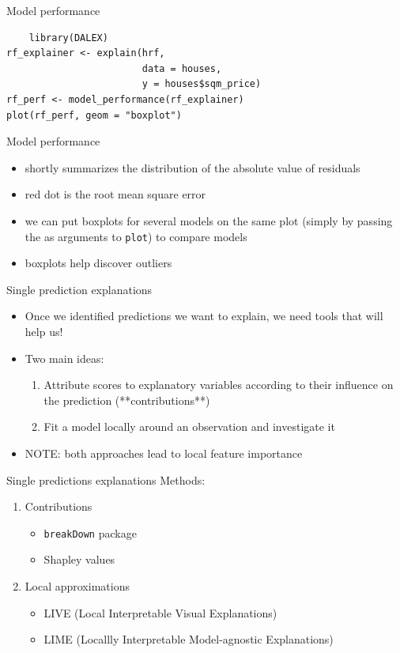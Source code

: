 \documentclass[xcolor={dvipsnames}]{beamer}
\begin{document}
\begin{frame}[fragile]{Model performance}
	\begin{lstlisting}
	library(DALEX)
rf_explainer <- explain(hrf, 
	                    data = houses, 
	                    y = houses$sqm_price)
rf_perf <- model_performance(rf_explainer)
plot(rf_perf, geom = "boxplot")
	\end{lstlisting}
\end{frame}

\begin{frame}{Model performance}
	\begin{itemize}
		\item shortly summarizes the distribution of the absolute value of residuals
		\item red dot is the root mean square error
		\item we can put boxplots for several models on the same plot (simply by passing the as arguments to \texttt{plot}) to compare models
		\item boxplots help discover outliers
	\end{itemize}
\end{frame}

\begin{frame}{Single prediction explanations}
	\begin{itemize}
		\item Once we identified predictions we want to explain, we need tools that will help us!
		\item Two main ideas:
		\begin{enumerate}
			\item Attribute scores to explanatory variables according to their influence on the prediction (**contributions**)
			
			\item Fit a model locally around an observation and investigate it
		\end{enumerate}
	    \item NOTE: both approaches lead to local feature importance
	\end{itemize}
\end{frame}

\begin{frame}{Single predictions explanations}
	Methods:
	\begin{enumerate}
		\item Contributions
		\begin{itemize}
			\item \texttt{breakDown} package
			\item Shapley values
		\end{itemize}
	    \item Local approximations
	    \begin{itemize}
	    	\item LIVE (Local Interpretable Visual Explanations)
	    	\item LIME (Locallly Interpretable Model-agnostic Explanations)
	    \end{itemize}
	\end{enumerate}
\end{frame}
\end{document}
